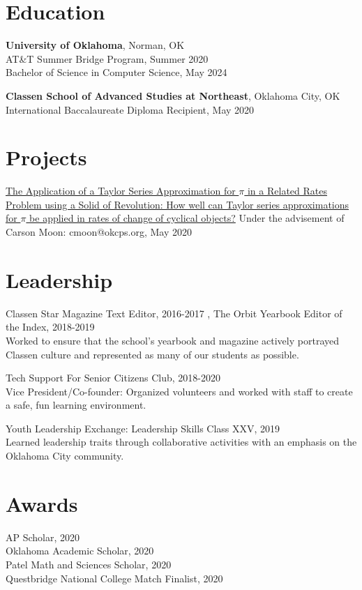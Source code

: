 \documentclass[12pt]{article}
\begin{document}
\section*{Education}
\textbf{University of Oklahoma}, Norman, OK \\
AT\&T Summer Bridge Program, Summer 2020 \\
Bachelor of Science in Computer Science, May 2024

\textbf{Classen School of Advanced Studies at Northeast}, Oklahoma City, OK \\
International Baccalaureate Diploma Recipient, May 2020

\section*{Projects}
\href{https://github.com/tttnguyen729/ee}{The Application of a Taylor Series Approximation for \(\pi\) in a Related Rates Problem using a Solid of Revolution: How well can Taylor series approximations for \(\pi\) be applied in rates of change of cyclical objects?} Under the advisement of Carson Moon: cmoon@okcps.org, May 2020 

\section*{Leadership}
Classen Star Magazine Text Editor, 2016-2017 , The Orbit Yearbook Editor of the Index, 2018-2019 \\
Worked to ensure that the school's yearbook and magazine actively portrayed Classen culture and represented as many of our students as possible.

Tech Support For Senior Citizens Club, 2018-2020 \\
Vice President/Co-founder: Organized volunteers and worked with staff to create a safe, fun learning environment.

Youth Leadership Exchange: Leadership Skills Class XXV, 2019 \\
Learned leadership traits through collaborative activities with an emphasis on the Oklahoma City community.

\section*{Awards}
AP Scholar, 2020 \\
Oklahoma Academic Scholar, 2020 \\
Patel Math and Sciences Scholar, 2020 \\
Questbridge National College Match Finalist, 2020 
\end{document}
